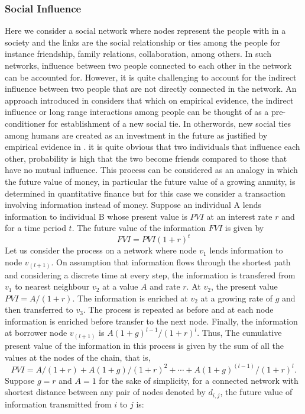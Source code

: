 \documentclass[10pt,a4paper]{article}
\begin{document}
    	    \subsubsection{Social Influence}    	
    	    	Here we consider a social network where nodes represent the people with in a society and the links are the social relationship or ties among the people for instance friendship, family relations, collaboration, among others. In such networks, influence between two people connected to each other in the network can be accounted for. However, it is quite challenging to account for the indirect influence between two people that are not directly connected in the network. An approach introduced in \citep{estrada2011epidemic}considers that which on empirical evidence, the indirect influence or long range interactions among people can be thought of as a pre-conditioner for establishment of a new social tie. In otherwords, new social ties among humans are created as an investment in the future as justified by empirical evidence in \citep{estrada2011epidemic}. it is quite obvious that two individuals that influence each other, probability is high that the two become friends compared to those that have no mutual influence. This process can be considered as an analogy in which the future value of money, in particular the future
    	    	value of a growing annuity, is determined in quantitative finance but for this case we consider a transaction involving information instead of money. Suppose an individual A lends information to individual B whose present value is $PVI$ at an interest rate $r$ and for a time period $t$. The future value of the information $FVI$ is given by
    	    	\begin{equation}
    	    	FVI = PVI (1+r)^t
    	    	\end{equation}
    	    	Let us consider the process on a network where node $v_1$ lends information to node $v_(l+1)$. On assumption that information flows through the shortest path and considering a discrete time at every step, the information is transfered from $v_1$ to nearest neighbour $v_2$ at a value $A$ and rate $r$. At $v_2$, the present value $PVI=A/(1+r)$. The information is enriched at $v_2$ at a growing rate of $g$ and then transferred to $v_3$. The process is repeated as before and at each node information is enriched before transfer to the next node. Finally, the information at borrower node $v_(l+1)$ is $A ( 1 + g )^ {l -1} /( 1 + r )^l$. Thus, The cumulative present
    	    	value of the information in this process is given by the sum of all the values at the nodes of the chain, that is,
    	    	\begin{equation}
    	    	PVI
    	    	= A /( 1 + r ) + A ( 1 + g )/( 1 + r )^2 + \cdots + A ( 1 + g )^(l -1) /( 1 + r )^l .
    	    	\end{equation}
    	    	Suppose $g=r$ and $A=1$ for the sake of simplicity, for a connected network with shortest distance between any pair of nodes denoted by $d_{i,j}$, the future value of information transmitted from $i$ to $j$ is:
    	    	
\end{document}
